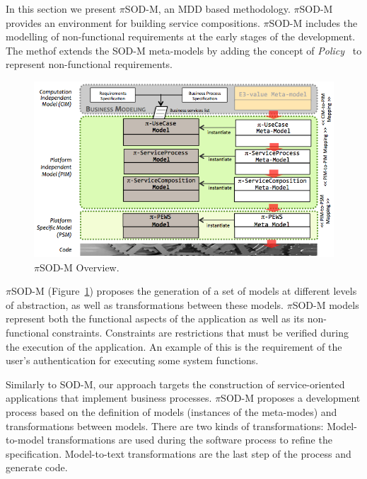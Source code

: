 
In this section we present $\pi$SOD-M, an MDD based methodology.
$\pi$SOD-M provides an environment for building service compositions.
$\pi$SOD-M includes the modelling of non-functional requirements at the early stages of the development.
The methof extends the SOD-M meta-models by adding the concept of \textit{Policy}~\cite{Espinosa-Oviedo2011a} to represent non-functional requirements.

\begin{figure}[h]
\centering
\includegraphics[width=1.0\textwidth]{figs/piSODM}
\caption{$\pi$SOD-M Overview.}
\label{fig:piSOD-M}
\end{figure}

$\pi$SOD-M (Figure~\ref{fig:piSOD-M}) proposes the generation of a set of models at different levels of abstraction, as well as transformations between these models.
$\pi$SOD-M models represent both the functional aspects of the application as well as its non-functional constraints.
Constraints are restrictions that must be verified during the execution of the application.
An example of this is the requirement of the user's authentication for executing some system functions.

Similarly to SOD-M, our approach targets the construction of service-oriented applications that implement business processes.
$\pi$SOD-M proposes a development process based on the definition of models (instances of the meta-modes) and transformations between models.
There are two kinds of transformations: Model-to-model transformations are used during the software process to refine the specification.
Model-to-text transformations are the last step of the process and generate code.


